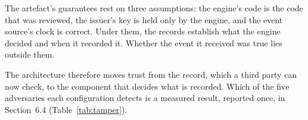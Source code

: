 The artefact's guarantees rest on three assumptions: the engine's code is the code that was reviewed, the issuer's key is held only by the engine, and the event source's clock is correct. Under them, the records establish what the engine decided and when it recorded it. Whether the event it received was true lies outside them.

The architecture therefore moves trust from the record, which a third party can now check, to the component that decides what is recorded. Which of the five adversaries each configuration detects is a measured result, reported once, in Section~6.4 (Table~\ref{tab:tamper}).
